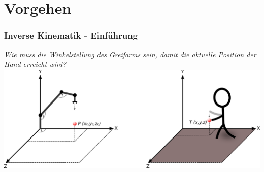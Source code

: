 \section{Vorgehen}
 

\begin{frame}
\frametitle{Inverse Kinematik - Einführung}
\textit{Wie muss die Winkelstellung des Greifarms sein, damit die aktuelle Position der Hand erreicht wird?}\\
\vspace*{1cm}
\includegraphics[width=\textwidth]{imgs/kinematikProblem.png}
\end{frame}

